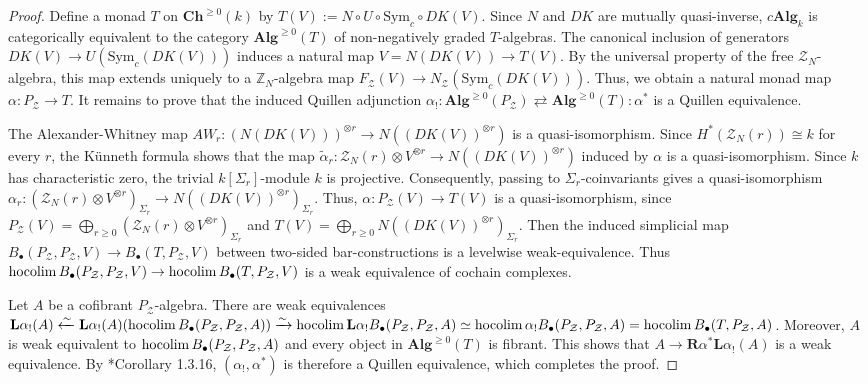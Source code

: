 \documentclass[11pt]{amsart}
\theoremstyle{definition}
\numberwithin{equation}{section}
\numberwithin{equation}{section}
\newcommand\ZZ{\mathbb{Z}}
\def\hocolim{\qopname\relax m{hocolim}}
\begin{document}
\begin{proof}
Define a monad $T$ on $\mathbf{Ch}^{\geq 0}(k)$ by $T(V):=N\circ U\circ \mathrm{Sym}_c\circ DK(V)$. Since $N$ and $DK$ are mutually quasi-inverse, $c\mathbf{Alg}_k$ is categorically equivalent to the category $\mathbf{Alg}^{\geq 0}(T)$ of non-negatively graded $T$-algebras. The canonical inclusion of generators $DK(V)\rightarrow U(\mathrm{Sym}_c(DK(V)))$ induces a natural map $V=N(DK(V))\rightarrow T(V)$. By the universal property of the free $\mathcal{Z}_{N}$-algebra, this map extends uniquely to a $\mathcal{\ZZ}_N$-algebra map $F_{\mathcal{Z}}(V)\rightarrow N_{\mathcal{Z}}(\mathrm{Sym}_c(DK(V)))$. Thus, we obtain a natural monad map $\alpha:P_{\mathcal{Z}}\rightarrow T$. It remains to prove that the induced Quillen adjunction $\alpha_{!}:\mathbf{Alg}^{\geq 0}(P_{\mathcal{Z}})\rightleftarrows \mathbf{Alg}^{\geq 0}(T):\alpha^*$ is a Quillen equivalence.

The Alexander-Whitney map $AW_r:(N(DK(V)))^{\otimes r}\rightarrow N((DK(V))^{\otimes r})$ is a quasi-isomorphism. Since $H^*(\mathcal{Z}_N(r))\cong k$ for every $r$, the K\"unneth formula shows that the map $\widetilde{\alpha}_r:\mathcal{Z}_N(r)\otimes V^{\otimes r}\rightarrow N((DK(V))^{\otimes r})$ induced by $\alpha$ is a quasi-isomorphism. Since $k$ has characteristic zero, the trivial $k[\Sigma_r]$-module $k$ is projective. Consequently, passing to $\Sigma_r$-coinvariants gives a quasi-isomorphism $\alpha_r:(\mathcal{Z}_N(r)\otimes V^{\otimes r})_{\Sigma_r}\rightarrow N((DK(V))^{\otimes r})_{\Sigma_r}$. Thus, $\alpha:P_{\mathcal{Z}}(V)\rightarrow T(V)$ is a quasi-isomorphism, since $P_{\mathcal{Z}}(V)=\bigoplus_{r\geq 0}(\mathcal{Z}_N(r)\otimes V^{\otimes r})_{\Sigma_r}$  and $T(V)=\bigoplus_{r\geq 0} N((DK(V))^{\otimes r})_{\Sigma_r}$. Then the induced simplicial map $B_{\bullet}(P_{\mathcal{Z}},P_{\mathcal{Z}},V)\rightarrow B_{\bullet}(T,P_{\mathcal{Z}},V)$ between two-sided bar-constructions is a levelwise weak-equivalence. Thus $\hocolim B_{\bullet}(P_{\mathcal{Z}},P_{\mathcal{Z}},V)\rightarrow \hocolim B_{\bullet}(T,P_{\mathcal{Z}},V)$ is a weak equivalence of cochain complexes. 

Let $A$ be a cofibrant $P_{\mathcal{Z}}$-algebra. There are weak equivalences $\mathbf{L}\alpha_{!}(A)\xleftarrow{\sim} \mathbf{L}\alpha_{!}(A)(\hocolim B_{\bullet}(P_{\mathcal{Z}},P_{\mathcal{Z}},A))\xrightarrow{\sim} \hocolim \mathbf{L}\alpha_{!}B_{\bullet}(P_{\mathcal{Z}},P_{\mathcal{Z}},A)\simeq \hocolim \alpha_{!}B_{\bullet}(P_{\mathcal{Z}},P_{\mathcal{Z}},A)=\hocolim B_{\bullet}(T,P_{\mathcal{Z}},A)$.
Moreover, $A$ is weak equivalent to $\hocolim B_{\bullet}(P_{\mathcal{Z}},P_{\mathcal{Z}},A)$ and every object in $\mathbf{Alg}^{\geq 0}(T)$ is fibrant. This shows that $A\rightarrow \mathbf{R}\alpha^*\mathbf{L}\alpha_{!}(A)$ is a weak equivalence. By \cite{Hovey-model-categories}*{Corollary 1.3.16}, $(\alpha_{!},\alpha^*)$ is therefore a Quillen equivalence, which completes the proof.
\end{proof}
\end{document}
